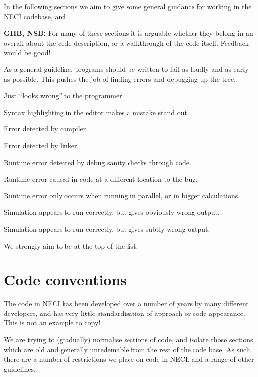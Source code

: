 \documentclass[a4paper,notitlepage]{scrreprt}
\newenvironment{packed_enum}{
	\begin{enumerate}
		\setlength{\itemsep}{1pt}
		\setlength{\parskip}{0pt}
		\setlength{\parsep}{0pt}
	}{\end{enumerate}}
\begin{document}
In the following sections we aim to give some general guidance for working in
the NECI codebase, and

\textbf{GHB, NSB:} For many of these sections it is arguable whether they
belong in an overall about-the code description, or a walkthrough of the code
itself. Feedback would be good!

\begin{mdframed}[ %
	linewidth = 2pt, %
	linecolor = red, %
	roundcorner = 6pt, %
	leftmargin = 10, %
	rightmargin = 10, %
	backgroundcolor = gray!20
]
As a general guideline, programs should be written to fail as loudly and as
early as possible. This pushes the job of finding errors and debugging up
the tree.

\begin{packed_enum}
	\item Just ``looks wrong'' to the programmer.
	\item Syntax highlighting in the editor makes a mistake stand out.
	\item Error detected by compiler.
	\item Error detected by linker.
	\item Runtime error detected by debug sanity checks through code.
	\item Runtime error caused in code at a different location to the bug.
	\item
		Runtime error only occurs when running in parallel, or in bigger
		calculations.
	\item
		Simulation appears to run correctly, but gives obviously wrong output.
	\item
		Simulation appears to run correctly, but gives subtly wrong output.
\end{packed_enum}
We strongly aim to be at the top of the list.
\end{mdframed}

\section{Code conventions}
The code in NECI has been developed over a number of years by many different
developers, and has very little standardisation of approach or code appearance.
This is not an example to copy!

We are trying to (gradually) normalise sections of code, and isolate those
sections which are old and generally unredemable from the rest of the code
base. As such there are a number of restrictions we place on code in NECI,
and a range of other guidelines.
\end{document}
